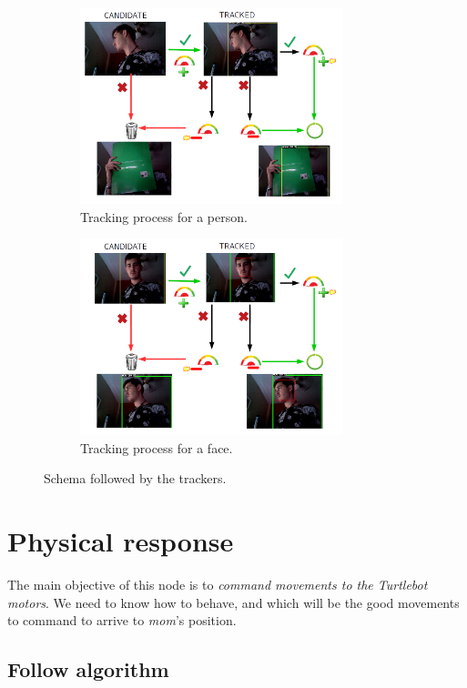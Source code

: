 	\begin{figure}[h]
		\centering
		\begin{subfigure}[b]{0.4\linewidth}
			\centering
			\includegraphics[width=3in]{images/person_tracker}
			\caption{Tracking process for a person.}
			\label{fig:6_person_tracker}
		\end{subfigure}
		\hfill
		\begin{subfigure}[b]{0.4\linewidth}
			\centering
			\includegraphics[width=3in]{images/face_tracker}
			\caption{Tracking process for a face.}
			\label{fig:6_face_tracker}
		\end{subfigure}
		\caption{Schema followed by the trackers.}
		\label{fig:6_trackers}
	\end{figure}

\section{Physical response}

		The main objective of this node is to \emph{command movements to the Turtlebot motors}. We need to know how to behave, and which will be the good movements to command to arrive to \emph{mom}'s position.
		
	\subsection{Follow algorithm}
		
